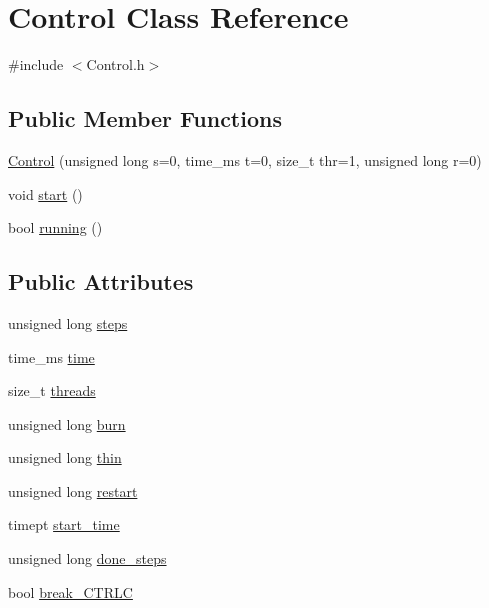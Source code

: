 \hypertarget{struct_control}{}\section{Control Class Reference}
\label{struct_control}


{\ttfamily \#include $<$Control.\+h$>$}

\subsection*{Public Member Functions}
\begin{DoxyCompactItemize}
\item 
\hyperlink{struct_control_a4ff9d1cb18c06b5438f09ef6a8e7af80}{Control} (unsigned long s=0, time\+\_\+ms t=0, size\+\_\+t thr=1, unsigned long r=0)
\item 
void \hyperlink{struct_control_a933994a3524f2f6d7ef0a17086e7cf66}{start} ()
\item 
bool \hyperlink{struct_control_a9217475a8ad619e7360524ae49c559a7}{running} ()
\end{DoxyCompactItemize}
\subsection*{Public Attributes}
\begin{DoxyCompactItemize}
\item 
unsigned long \hyperlink{struct_control_af4bd5a6c779079b5e921b4df40760266}{steps}
\item 
time\+\_\+ms \hyperlink{struct_control_a273f3488d567bb10871e71245a406f3e}{time}
\item 
size\+\_\+t \hyperlink{struct_control_af130110f07dc3bced4d8d0fafac5b755}{threads}
\item 
unsigned long \hyperlink{struct_control_acb1e669784385d64b9f840674a3e08c1}{burn}
\item 
unsigned long \hyperlink{struct_control_a08030350e86fd21411599690892e31a8}{thin}
\item 
unsigned long \hyperlink{struct_control_acd75b8aa48fdb33f063bae7469a9721b}{restart}
\item 
timept \hyperlink{struct_control_ad3c2691a66705880844f467cf5da8aab}{start\+\_\+time}
\item 
unsigned long \hyperlink{struct_control_a4a1867401c3e89aecaf14949521ed247}{done\+\_\+steps}
\item 
bool \hyperlink{struct_control_a3a1856c582efd2a6a1b8f40351038d0c}{break\+\_\+\+C\+T\+R\+LC}
\end{DoxyCompactItemize}


